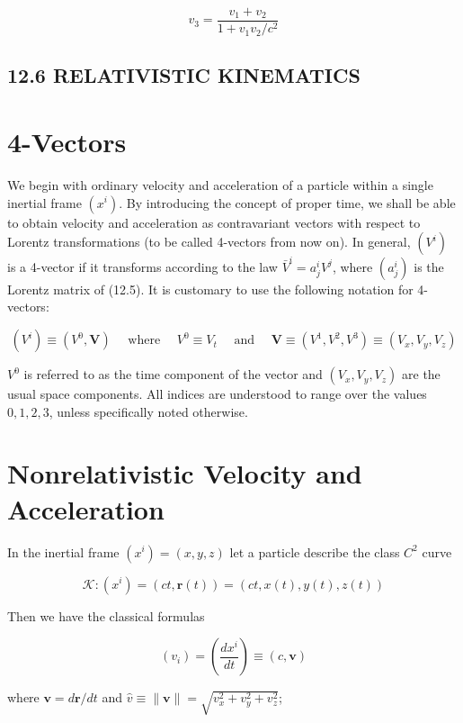 \documentclass[10pt]{article}
\begin{document}
\begin{equation*}
v_{3}=\frac{v_{1}+v_{2}}{1+v_{1} v_{2} / c^{2}} \tag{12.16}
\end{equation*}


\subsection*{12.6 RELATIVISTIC KINEMATICS}
\section*{4-Vectors}
We begin with ordinary velocity and acceleration of a particle within a single inertial frame $\left(x^{i}\right)$. By introducing the concept of proper time, we shall be able to obtain velocity and acceleration as contravariant vectors with respect to Lorentz transformations (to be called 4-vectors from now on). In general, $\left(V^{i}\right)$ is a 4-vector if it transforms according to the law $\bar{V}^{i}=a_{j}^{i} V^{j}$, where $\left(a_{j}^{i}\right)$ is the Lorentz matrix of (12.5). It is customary to use the following notation for 4-vectors:

$$
\left(V^{i}\right) \equiv\left(V^{0}, \mathbf{V}\right) \quad \text { where } \quad V^{0} \equiv V_{t} \quad \text { and } \quad \mathbf{V} \equiv\left(V^{1}, V^{2}, V^{3}\right) \equiv\left(V_{x}, V_{y}, V_{z}\right)
$$

$V^{0}$ is referred to as the time component of the vector and $\left(V_{x}, V_{y}, V_{z}\right)$ are the usual space components. All indices are understood to range over the values $0,1,2,3$, unless specifically noted otherwise.

\section*{Nonrelativistic Velocity and Acceleration}
In the inertial frame $\left(x^{i}\right)=(x, y, z)$ let a particle describe the class $C^{2}$ curve

$$
\mathscr{K}:\left(x^{i}\right)=(c t, \mathbf{r}(t))=(c t, x(t), y(t), z(t))
$$

Then we have the classical formulas


\begin{equation*}
\left(v_{i}\right)=\left(\frac{d x^{i}}{d t}\right) \equiv(c, \mathbf{v}) \tag{12.17}
\end{equation*}


where $\mathbf{v}=d \mathbf{r} / d t$ and $\hat{v} \equiv\|\mathbf{v}\|=\sqrt{v_{x}^{2}+v_{y}^{2}+v_{z}^{2}}$;
\end{document}
